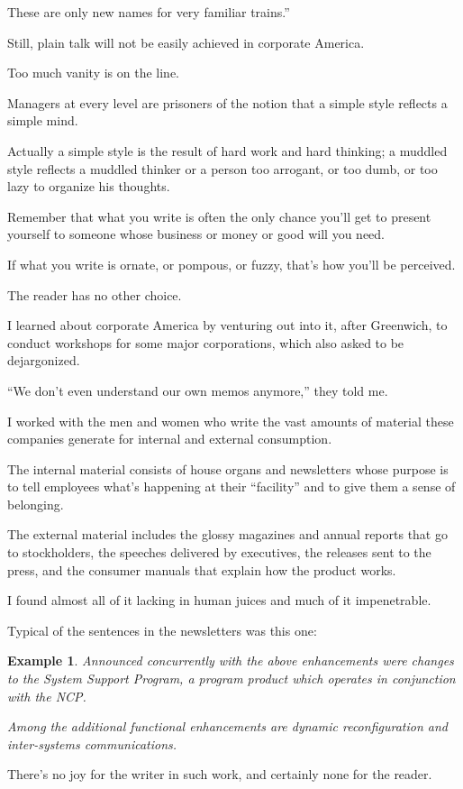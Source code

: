 \documentclass{book}
\numberwithin{equation}{section}
\newtheorem{example}{Example}[chapter]
\begin{document}
These are only new names for very familiar trains.''

%
Still, plain talk will not be easily achieved in corporate America.

Too much vanity is on the line.

Managers at every level are prisoners of the notion that a simple style reflects a simple mind.

Actually a simple style is the result of hard work and hard thinking; a muddled style reflects a muddled thinker or a person too arrogant, or too dumb, or too lazy to organize his thoughts.

Remember that what you write is often the only chance you'll get to present yourself to someone whose business or money or good will you need.

If what you write is ornate, or pompous, or fuzzy, that's how you'll be perceived.

The reader has no other choice.

%
I learned about corporate America by venturing out into it, after Greenwich, to conduct workshops for some major corporations, which also asked to be dejargonized.

``We don't even understand our own memos anymore,'' they told me.

I worked with the men and women who write the vast amounts of material these companies generate for internal and external consumption.

The internal material consists of house organs and newsletters whose purpose is to tell employees what's happening at their ``facility'' and to give them a sense of belonging.

The external material includes the glossy magazines and annual reports that go to stockholders, the speeches delivered by executives, the releases sent to the press, and the consumer manuals that explain how the product works.

I found almost all of it lacking in human juices and much of it impenetrable.

%
Typical of the sentences in the newsletters was this one:
\begin{example}
    Announced concurrently with the above enhancements were changes to the System Support Program, a program product which operates in conjunction with the NCP.
    
    Among the additional functional enhancements are dynamic reconfiguration and inter-systems communications.
\end{example}
There's no joy for the writer in such work, and certainly none for the reader.
\end{document}
